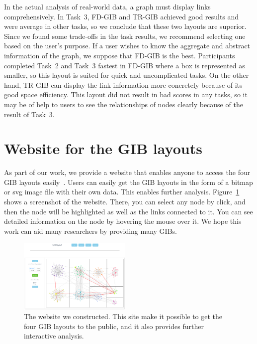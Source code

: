 \documentclass[review]{vgtc}                 %
\begin{document}
In the actual analysis of real-world data, a graph must display links comprehensively.
In Task~3, FD-GIB and TR-GIB achieved good results and were average in other tasks, so we conclude that these two layouts are superior.
Since we found some trade-offs in the task results, we recommend selecting one based on the user's purpose.
If a user wishes to know the aggregate and abstract information of the graph, we suppose that FD-GIB is the best.
Participants completed Task~2 and Task~3 fastest in FD-GIB where a box is represented as smaller, so this layout is suited for quick and uncomplicated tasks.
On the other hand, TR-GIB can display the link information more concretely because of its good space efficiency.
This layout did not result in bad scores in any tasks, so it may be of help to users to see the relationships of nodes clearly because of the result of Task~3.


\section{Website for the GIB layouts}
As part of our work, we provide a website that enables anyone to access the four GIB layouts easily~\cite{gibweb}.
Users can easily get the GIB layouts in the form of a bitmap or svg image file with their own data.
This enables further analysis.
Figure~\ref{website} shows a screenshot of the website.
There, you can select any node by click, and then the node will be highlighted as well as the links connected to it.
You can see detailed information on the node by hovering the mouse over it.
We hope this work can aid many researchers by providing many GIBs.

\begin{figure}
  \begin{center}
    \includegraphics[width=0.48\textwidth]{pictures/website.png}
    \caption{The website we constructed. This site make it possible to get the four GIB layouts to the public, and it also provides further interactive analysis.}
    \label{website}
  \end{center}
\end{figure}
\end{document}
